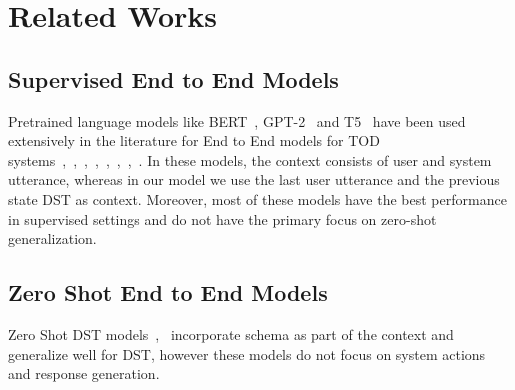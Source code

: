 \section{Related Works}

\subsection{Supervised End to End Models}
Pretrained language models like BERT~\cite{Devlin2019BERTPO}, GPT-2~\cite{Radford2019LanguageMA} and T5~\cite{Raffel2019ExploringTL}
have been used extensively in the literature for End to End models for TOD systems~\cite{HosseiniAsl2020ASL},~\cite{Peng2021SoloistBT},~\cite{Lee2020SUMBTLaRLEN},~\cite{Yang2020UBARTF},~\cite{Jeon2021DORATP},~\cite{Sun2022BORTBA},~\cite{Yang2022UBARv2TM},~\cite{Noroozi2020AFA}.
In these models, the context consists of user and system utterance, whereas in our model we use the last user utterance and the previous state DST as context.
Moreover, most of these models have the best performance in supervised settings and do not have the primary focus on zero-shot generalization.

\subsection{Zero Shot End to End Models}

Zero Shot DST models~\cite{Feng2020ASA},~\cite{Zhao2022DescriptionDrivenTD} incorporate schema as part of the context and generalize
well for DST, however these models do not focus on system actions and response generation.
\cite{Noroozi2020AFA}